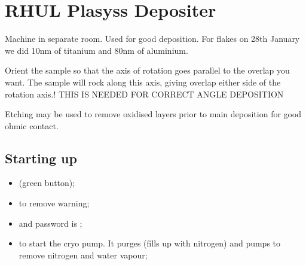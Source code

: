 \section{RHUL Plasyss Depositer\label{sec:plassys}}
Machine in  separate room.  Used  for good deposition. For  flakes on
28th January we did 10nm of titanium and 80nm of aluminium.

\begin{framed}\noindent
  Orient the sample so that the axis of rotation goes parallel to the
  overlap you  want.  The  sample will rock  along this  axis, giving
  overlap  either side  of the  rotation axis.!   THIS IS  NEEDED FOR
  CORRECT ANGLE DEPOSITION

  Etching  may  be used  to  remove  oxidised  layers prior  to  main
  deposition for good ohmic contact.
\end{framed}

\subsection{Starting up}
\begin{itemize}
\item  {} (green button);
\item {} to remove warning;
\item   {}   and   password   is
  ;
\item  {} to  start the  cryo
  pump.   It purges  (fills up  with  nitrogen) and  pumps to  remove
  nitrogen and water vapour;
\end{itemize}
